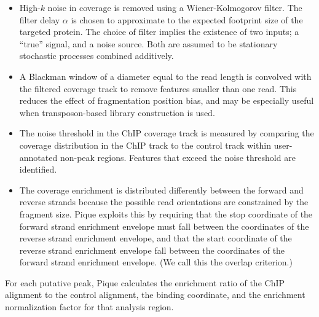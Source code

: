 \documentclass{bioinfo}
\begin{document}
\begin{methods}
\begin{itemize}
%

\item High-$k$ noise in coverage is removed using a Wiener-Kolmogorov
  filter. The filter delay $\alpha$ is chosen to approximate to the
  expected footprint size of the targeted protein. The choice of
  filter implies the existence of two inputs; a ``true'' signal, and a
  noise source. Both are assumed to be stationary stochastic processes
  combined additively.


\item A Blackman window of a diameter equal to the read length is
  convolved with the filtered coverage track to remove features
  smaller than one read. This reduces the effect of fragmentation
  position bias, and may be especially useful when transposon-based
  library construction is used.

\item The noise threshold in the ChIP coverage track is measured by
  comparing the coverage distribution in the ChIP track to the control
  track within user-annotated non-peak regions. Features that exceed
  the noise threshold are identified.

\item The coverage enrichment is distributed differently between the
  forward and reverse strands because the possible read orientations
  are constrained by the fragment size. Pique exploits this by
  requiring that the stop coordinate of the forward strand enrichment
  envelope must fall between the coordinates of the reverse strand
  enrichment envelope, and that the start coordinate of the reverse
  strand enrichment envelope fall between the coordinates of the
  forward strand enrichment envelope. (We call this the overlap
  criterion.)

\end{itemize}


\noindent For each putative peak, Pique calculates the enrichment
ratio of the ChIP alignment to the control alignment, the binding
coordinate, and the enrichment normalization factor for that analysis
region. 

\end{methods}
\end{document}
